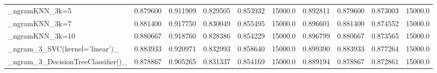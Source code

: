 \begin{tabular}{lrrrrrrrrr}
\_ngramKNN\_3k=5                                     &  0.879600 &         0.911909 &      0.829505 &        0.853932 &        15000.0 &            0.892811 &         0.879600 &           0.873003 &           15000.0 \\
\_ngramKNN\_3k=7                                     &  0.881400 &         0.917750 &      0.830049 &        0.855495 &        15000.0 &            0.896601 &         0.881400 &           0.874552 &           15000.0 \\
\_ngramKNN\_3k=10                                    &  0.880667 &         0.918760 &      0.828386 &        0.854229 &        15000.0 &            0.896799 &         0.880667 &           0.873565 &           15000.0 \\
\_ngram\_3\_SVC(kernel='linear')\_                     &  0.883933 &         0.920971 &      0.832993 &        0.858640 &        15000.0 &            0.899390 &         0.883933 &           0.877264 &           15000.0 \\
\_ngram\_3\_DecisionTreeClassifier()\_                 &  0.878867 &         0.905265 &      0.831337 &        0.854169 &        15000.0 &            0.889194 &         0.878867 &           0.872861 &           15000.0 \\
\bottomrule
\end{tabular}

